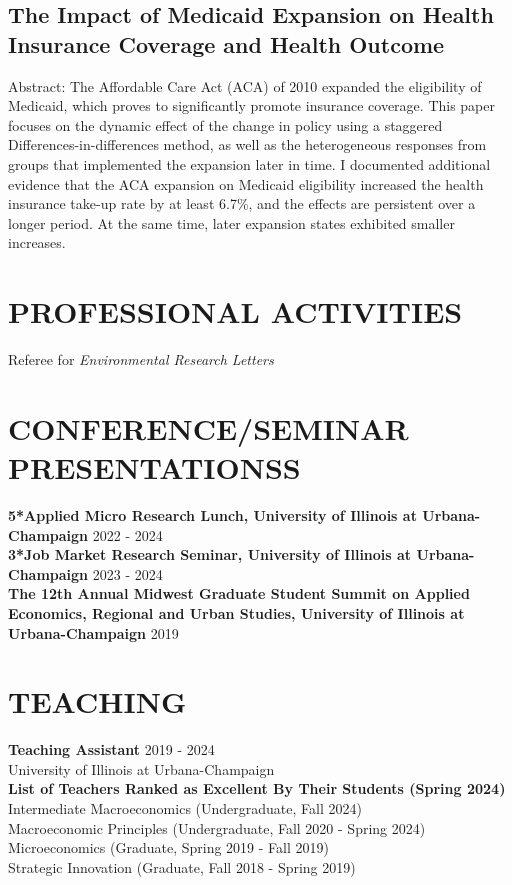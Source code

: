 \documentclass[a4paper,9pt]{extarticle}
\begin{document}
\subsection*{The Impact of Medicaid Expansion on Health Insurance Coverage and Health Outcome}
Abstract: The Affordable Care Act (ACA) of 2010 expanded the eligibility of Medicaid, which proves to significantly promote insurance coverage. This paper focuses on the dynamic effect of the change in policy using a staggered Differences-in-differences method, as well as the heterogeneous responses from groups that implemented the expansion later in time. I documented additional evidence that the ACA expansion on Medicaid eligibility increased the health insurance take-up rate by at least 6.7\%, and the effects are persistent over a longer period. At the same time, later expansion states exhibited smaller increases.

\section*{PROFESSIONAL ACTIVITIES}
Referee for {\sl Environmental Research Letters}

\section*{CONFERENCE/SEMINAR PRESENTATIONSS}

\noindent
\newline
\textbf{5*Applied Micro Research Lunch, University of Illinois at Urbana-Champaign} \hfill  2022 - 2024 \\
\textbf{3*Job Market Research Seminar, University of Illinois at Urbana-Champaign} \hfill  2023 - 2024 \\
\textbf{The 12th Annual Midwest Graduate Student Summit on Applied Economics, Regional and Urban Studies, University of Illinois at Urbana-Champaign} \hfill 2019 \\


\section*{TEACHING}

\noindent
\textbf{Teaching Assistant} \hfill 2019 - 2024 \\
University of Illinois at Urbana-Champaign \\
\textbf{List of Teachers Ranked as Excellent By Their Students (Spring 2024)}
\newline
Intermediate Macroeconomics (Undergraduate, Fall 2024) \\
Macroeconomic Principles (Undergraduate, Fall 2020 - Spring 2024) \\
Microeconomics (Graduate, Spring 2019 - Fall 2019) \\
Strategic Innovation (Graduate, Fall 2018 - Spring 2019) \\
\end{document}

